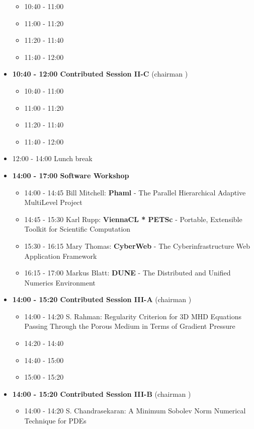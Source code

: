 \documentclass[10pt, A4]{article}%
\begin{document}
\begin{itemize}
  \begin{itemize}
    \item 10:40 - 11:00
    \item 11:00 - 11:20 
    \item 11:20 - 11:40 
    \item 11:40 - 12:00  
  \end{itemize}
  \item {\bf 10:40 - 12:00 Contributed Session II-C} (chairman ) 
  \begin{itemize}
    \item 10:40 - 11:00
    \item 11:00 - 11:20 
    \item 11:20 - 11:40 
    \item 11:40 - 12:00 
  \end{itemize}
  \item 12:00 - 14:00 Lunch break
  \item {\bf 14:00 - 17:00 Software Workshop}
  \begin{itemize}
    \item 14:00 - 14:45 Bill Mitchell: {\bf Phaml} - The Parallel Hierarchical Adaptive MultiLevel Project
    \item 14:45 - 15:30 Karl Rupp: {\bf ViennaCL * PETSc} - Portable, Extensible Toolkit for Scientific Computation
    \item 15:30 - 16:15 Mary Thomas: {\bf CyberWeb} - The Cyberinfrastructure Web Application Framework
    \item 16:15 - 17:00 Markus Blatt: {\bf DUNE} - The Distributed and Unified Numerics Environment
  \end{itemize}
  \item {\bf 14:00 - 15:20 Contributed Session III-A} (chairman ) 
  \begin{itemize}
    \item 14:00 - 14:20 {S. Rahman}: {Regularity Criterion for 3D MHD Equations Passing Through the Porous Medium in Terms of Gradient Pressure}
    \item 14:20 - 14:40 
    \item 14:40 - 15:00
    \item 15:00 - 15:20  
  \end{itemize}
  \item {\bf 14:00 - 15:20 Contributed Session III-B} (chairman ) 
  \begin{itemize}
    \item 14:00 - 14:20 {S. Chandrasekaran}: {A Minimum Sobolev Norm Numerical Technique for PDEs}

\end{itemize}
\end{itemize}
\end{document}
